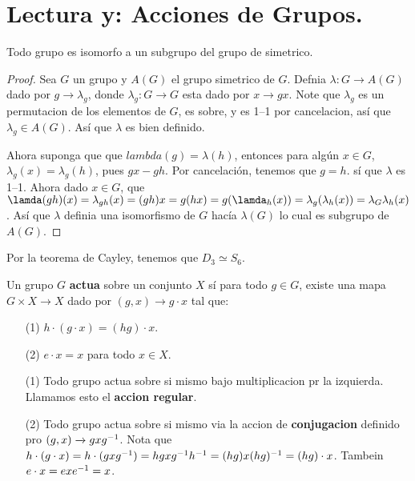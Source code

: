 \section*{Lectura y: Acciones de Grupos.}

\begin{theorem}\label{thm_7.26}
    Todo grupo es isomorfo a un subgrupo del grupo de simetrico.
\end{theorem}
\begin{proof}
    Sea $G$ un grupo y  $A(G)$ el grupo simetrico de $G$. Defnia $\lambda:G
    \xrightarrow{} A(G)$ dado por $g \xrightarrow{} \lambda_g$, donde
    $\lambda_g:G \xrightarrow{} G$ esta dado por $x \xrightarrow{} gx$. Note que
    $\lambda_g$ es un permutacion de los elementos de  $G$, es sobre, y es 1--1
    por cancelacion, as\'i que  $\lambda_g \in A(G)$. As\'i que $\lambda$ es
    bien definido.

    Ahora suponga que que  $lambda(g)=\lambda(h)$, entonces para alg\'un $x \in
    G$,  $\lambda_g(x)=\lambda_g(h)$, pues $gx-gh$. Por cancelaci\'on, tenemos
    que  $g=h$. s\'i que  $\lambda$ es 1--1. Ahora dado  $x \in G$, que
    $\lamda(gh)(x)=\lambda_{gh}(x)=(gh)x=g(hx)=g(\lamda_h(x))=\lambda_g(\lambda_h(x))=
    \lambda_G\lambda_h(x)$. As\'i que $\lambda$ definia  una isomorfismo de $G$
    hac\'ia  $\lambda(G)$ lo cual es subgrupo de $A(G)$.
\end{proof}

\begin{example}\label{}
    Por la teorema de Cayley, tenemos que $D_3 \simeq S_6$.
\end{example}

\begin{definition}
    Un grupo $G$  \textbf{actua} sobre un conjunto $X$ s\'i para todo  $g \in
    G$, existe una mapa  $G \times X \xrightarrow{} X$ dado por $(g,x)
    \xrightarrow{} g \cdot x$ tal que:
    \begin{enumerate}
        \item[(1)] $h \cdot (g \cdot x)=(hg) \cdot x$.

        \item[(2)] $e \cdot x=x$ para todo  $x \in X$.
    \end{enumerate}
\end{definition}

\begin{example}\label{}
    \begin{enumerate}
        \item[(1)] Todo grupo actua sobre si mismo bajo multiplicacion pr la
            izquierda. Llamamos esto el \textbf{accion regular}.

        \item[(2)] Todo grupo actua sobre si mismo via la accion de
            \textbf{conjugacion} definido pro $(g,x) \xrightarrow{} gxg^{-1}$.
            Nota que $h \cdot (g \cdot x)=h \cdot
            (gxg^{-1})=hgxg^{-1}h^{-1}=(hg)x(hg)^{-1}=(hg) \cdot x$. Tambein
            $e \cdot x=exe^{-1}=x$.
    \end{enumerate}
\end{example}

